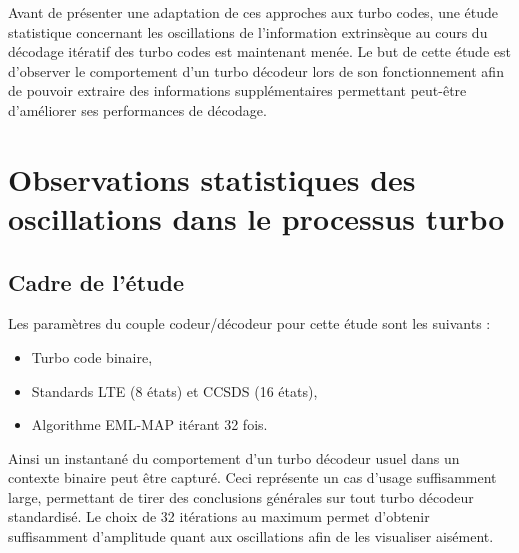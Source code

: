 Avant de présenter une adaptation de ces approches aux turbo codes, une étude statistique concernant les oscillations 
de l'information extrinsèque au cours du décodage itératif des turbo codes est maintenant menée.
Le but de cette étude est d'observer le comportement d'un turbo décodeur lors de son fonctionnement afin de pouvoir 
extraire des informations supplémentaires permettant peut-être d'améliorer ses performances de décodage.

\section{Observations statistiques des oscillations dans le processus turbo}\label{sec:observ}

\subsection{Cadre de l'étude}
Les paramètres du couple codeur/décodeur pour cette étude sont les suivants :
\begin{itemize}
	\item Turbo code binaire,
	\item Standards LTE (8 états) et CCSDS (16 états),
	\item Algorithme EML-MAP itérant 32 fois.\newline
\end{itemize}
Ainsi un instantané du comportement d'un turbo décodeur usuel dans un contexte binaire peut être capturé. Ceci représente 
un cas d'usage suffisamment large, permettant de tirer des conclusions générales sur tout turbo décodeur standardisé.
Le choix de 32 
itérations au maximum permet d'obtenir suffisamment d'amplitude quant aux oscillations afin de les visualiser aisément. 

